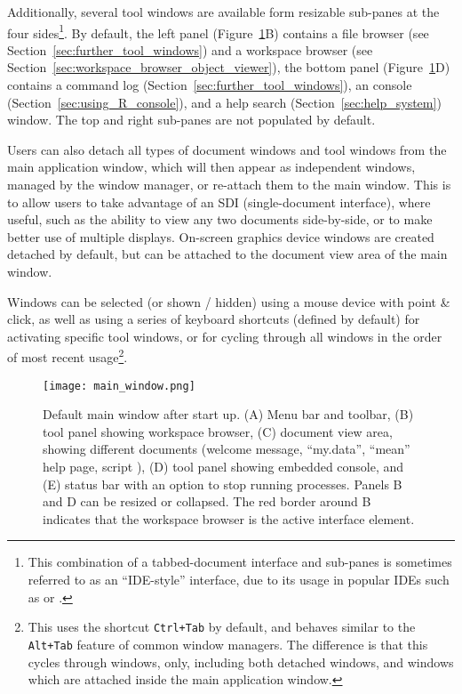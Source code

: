 Additionally, several tool windows are available form resizable sub-panes at the four sides\footnote{
    This combination of a tabbed-document interface and sub-panes is sometimes referred to as an ``IDE-style'' interface, due to its
    usage in popular IDEs such as  \citep{Eclipse} or  \citep{KDevelop}.
}. By default, the
left panel (Figure~\ref{fig:main_window}B) contains a file browser (see Section~\ref{sec:further_tool_windows}) and a
workspace browser (see Section~\ref{sec:workspace_browser_object_viewer}), the
bottom panel (Figure~\ref{fig:main_window}D) contains a command
log (Section~\ref{sec:further_tool_windows}), an  console
(Section~\ref{sec:using_R_console}), and a help search (Section~\ref{sec:help_system}) window. The top and right sub-panes are
not populated by default.

Users can also detach all types of document windows and tool windows from the main application window, which will
then appear as independent windows, managed by the window manager, or re-attach them to the main window.
This is to allow users to take advantage of an SDI (single-document interface), where useful, such as the ability to view any two
documents side-by-side, or to make better use of multiple displays. On{}-screen
graphics device windows are created detached by default, but can 
be attached to the document view area of the main window.

Windows can be selected (or shown / hidden) using a mouse device with point \&
click, as well as using a series of keyboard shortcuts (defined by
default) for activating specific tool windows, or for cycling through all windows
in the order of most recent usage\footnote{
    This uses the shortcut \texttt{Ctrl+Tab} by default, and behaves similar to the \texttt{Alt+Tab}
    feature of common window managers. The difference is that this cycles through  windows,
    only, including both detached windows, and windows which are attached inside the main application
    window.
}.

\begin{figure}[t!]
 \centering
 \texttt{[image: main\_window.png]}
 \caption{Default  main window after start up. 
(A) Menu bar and toolbar, (B) tool panel showing workspace browser, (C) document view area, showing
different documents (welcome message,  ``my.data'', ``mean'' help page, 
script ), (D) tool panel showing embedded  console, and (E) status bar with an option to
stop running processes. Panels B and D can be resized or collapsed. The red border around B indicates that the
workspace browser is the active interface element.}
 \label{fig:main_window}
\end{figure}

